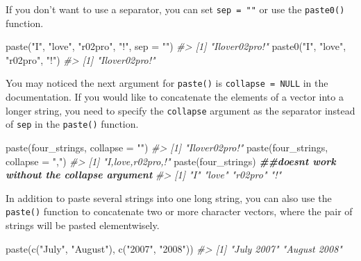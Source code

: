 \documentclass[
]{book}
\newenvironment{Shaded}{\begin{snugshade}}{\end{snugshade}}
\newcommand{\AttributeTok}[1]{\textcolor[rgb]{0.77,0.63,0.00}{#1}}
\newcommand{\CommentTok}[1]{\textcolor[rgb]{0.56,0.35,0.01}{\textit{#1}}}
\newcommand{\DocumentationTok}[1]{\textcolor[rgb]{0.56,0.35,0.01}{\textbf{\textit{#1}}}}
\newcommand{\FunctionTok}[1]{\textcolor[rgb]{0.00,0.00,0.00}{#1}}
\newcommand{\NormalTok}[1]{#1}
\newcommand{\StringTok}[1]{\textcolor[rgb]{0.31,0.60,0.02}{#1}}
\begin{document}
If you don't want to use a separator, you can set \texttt{sep\ =\ ""} or use the \texttt{paste0()} function.

\begin{Shaded}
\begin{Highlighting}[]
\FunctionTok{paste}\NormalTok{(}\StringTok{"I"}\NormalTok{, }\StringTok{"love"}\NormalTok{, }\StringTok{"r02pro"}\NormalTok{, }\StringTok{"!"}\NormalTok{, }\AttributeTok{sep =} \StringTok{""}\NormalTok{)}
\CommentTok{\#\textgreater{} [1] "Ilover02pro!"}
\FunctionTok{paste0}\NormalTok{(}\StringTok{"I"}\NormalTok{, }\StringTok{"love"}\NormalTok{, }\StringTok{"r02pro"}\NormalTok{, }\StringTok{"!"}\NormalTok{) }
\CommentTok{\#\textgreater{} [1] "Ilover02pro!"}
\end{Highlighting}
\end{Shaded}

You may noticed the next argument for \texttt{paste()} is \texttt{collapse\ =\ NULL} in the documentation. If you would like to concatenate the elements of a vector into a longer string, you need to specify the \texttt{collapse} argument as the separator instead of \texttt{sep} in the \texttt{paste()} function.

\begin{Shaded}
\begin{Highlighting}[]
\FunctionTok{paste}\NormalTok{(four\_strings, }\AttributeTok{collapse =} \StringTok{""}\NormalTok{)}
\CommentTok{\#\textgreater{} [1] "Ilover02pro!"}
\FunctionTok{paste}\NormalTok{(four\_strings, }\AttributeTok{collapse =} \StringTok{","}\NormalTok{)}
\CommentTok{\#\textgreater{} [1] "I,love,r02pro,!"}
\FunctionTok{paste}\NormalTok{(four\_strings)                 }\DocumentationTok{\#\#doesn\textquotesingle{}t work without the collapse argument}
\CommentTok{\#\textgreater{} [1] "I"      "love"   "r02pro" "!"}
\end{Highlighting}
\end{Shaded}

In addition to paste several strings into one long string, you can also use the \texttt{paste()} function to concatenate two or more character vectors, where the pair of strings will be pasted elementwisely.

\begin{Shaded}
\begin{Highlighting}[]
\FunctionTok{paste}\NormalTok{(}\FunctionTok{c}\NormalTok{(}\StringTok{"July"}\NormalTok{, }\StringTok{"August"}\NormalTok{),  }\FunctionTok{c}\NormalTok{(}\StringTok{"2007"}\NormalTok{, }\StringTok{"2008"}\NormalTok{))}
\CommentTok{\#\textgreater{} [1] "July 2007"   "August 2008"}
\end{Highlighting}
\end{Shaded}
\end{document}
